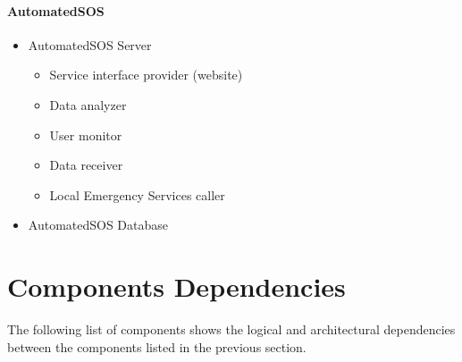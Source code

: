 \documentclass[../DD.tex]{subfiles}
\begin{document}
		\paragraph{AutomatedSOS}
		\begin{itemize}
			\item{AutomatedSOS Server}
				\begin{itemize}
					\item{Service interface provider (website)}
					\item{Data analyzer}
					\item{User monitor}
					\item{Data receiver}
					\item{Local Emergency Services caller}
				\end{itemize}
			\item{AutomatedSOS Database}
		\end{itemize}

	\section{Components Dependencies}
		The following list of components shows the logical and architectural dependencies between the components listed in the previous section.
\end{document}
